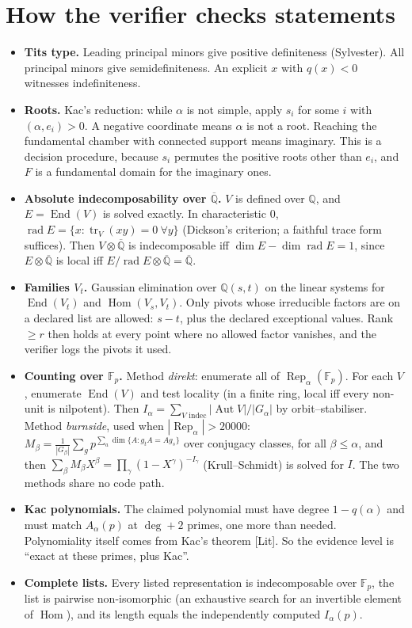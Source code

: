 \documentclass[11pt]{article}
\theoremstyle{definition}\newtheorem{definition}[theorem]{Definition}\newtheorem{remark}[theorem]{Remark}\newtheorem{observation}[theorem]{Numerical observation}
\begin{document}
\section{How the verifier checks statements}
\begin{itemize}
\item \textbf{Tits type.} Leading principal minors give positive definiteness (Sylvester). All principal minors give semidefiniteness. An
explicit $x$ with $q(x)<0$ witnesses indefiniteness.
\item \textbf{Roots.} Kac's reduction: while $\alpha$ is not simple, apply $s_i$ for some $i$ with $(\alpha,e_i)>0$. A negative coordinate means $\alpha$ is
not a root. Reaching the fundamental chamber with connected support means imaginary. This is a decision procedure, because $s_i$ permutes the
positive roots other than $e_i$, and $F$ is a fundamental domain for the imaginary ones.
\item \textbf{Absolute indecomposability over $\overline{\mathbb Q}$.} $V$ is defined over $\mathbb Q$, and $E=\operatorname{End}(V)$ is solved exactly.
In characteristic $0$, $\operatorname{rad}E=\{x:\operatorname{tr}_V(xy)=0\ \forall y\}$ (Dickson's criterion; a faithful trace form suffices).
Then $V\otimes\overline{\mathbb Q}$ is indecomposable iff $\dim E-\dim\operatorname{rad}E=1$, since $E\otimes\overline{\mathbb Q}$ is local iff
$E/\operatorname{rad}E\otimes\overline{\mathbb Q}=\overline{\mathbb Q}$.
\item \textbf{Families $V_t$.} Gaussian elimination over $\mathbb Q(s,t)$ on the linear systems for $\operatorname{End}(V_t)$ and
$\operatorname{Hom}(V_s,V_t)$. Only pivots whose irreducible factors are on a declared list are allowed: $s-t$, plus the declared exceptional values.
Rank $\ge r$ then holds at every point where no allowed factor vanishes, and the verifier logs the pivots it used.
\item \textbf{Counting over $\mathbb F_p$.} Method \emph{direkt}: enumerate all of $\operatorname{Rep}_\alpha(\mathbb F_p)$. For each $V$,
enumerate $\operatorname{End}(V)$ and test locality (in a finite ring, local iff every non-unit is nilpotent). Then
$I_\alpha=\sum_{V\text{ indec}}|\operatorname{Aut}V|/|G_\alpha|$ by orbit--stabiliser. Method \emph{burnside}, used when $|\operatorname{Rep}_\alpha|>20000$:
$M_\beta=\frac1{|G_\beta|}\sum_{g}p^{\sum_a\dim\{A:g_tA=Ag_s\}}$ over conjugacy classes, for all $\beta\le\alpha$, and then
$\sum_\beta M_\beta X^\beta=\prod_\gamma(1-X^\gamma)^{-I_\gamma}$ (Krull--Schmidt) is solved for $I$. The two methods share no code path.
\item \textbf{Kac polynomials.} The claimed polynomial must have degree $1-q(\alpha)$ and must match $A_\alpha(p)$ at $\deg+2$ primes, one more than needed.
Polynomiality itself comes from Kac's theorem [Lit]. So the evidence level is ``exact at these primes, plus Kac''.
\item \textbf{Complete lists.} Every listed representation is indecomposable over $\mathbb F_p$, the list is pairwise non-isomorphic
(an exhaustive search for an invertible element of $\operatorname{Hom}$), and its length equals the independently computed $I_\alpha(p)$.
\end{itemize}
\end{document}
